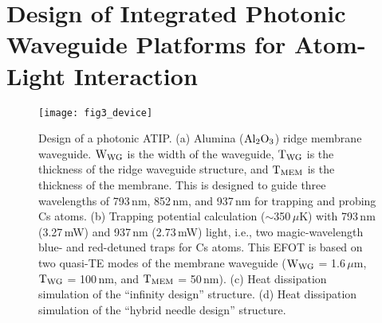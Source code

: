 \documentclass{osa-article}
\begin{document}
\section{Design of Integrated Photonic Waveguide Platforms for Atom-Light Interaction}

\begin{figure}[b!]
\centering\texttt{[image: fig3\_device]}
\caption{Design of a photonic ATIP. (a) Alumina ($\rm{Al_{2}O_{3}}$) ridge membrane waveguide. $\rm{W_{WG}}$ is the width of the waveguide, $\rm{T_{WG}}$ is the thickness of the ridge waveguide structure, and $\rm{T_{MEM}}$ is the thickness of the membrane. This is designed to guide three wavelengths of 793\,nm, 852\,nm, and 937\,nm for trapping and probing Cs atoms. (b) Trapping potential calculation ($\sim$350\,$\mu$K) with 793\,nm (3.27\,mW) and 937\,nm (2.73\,mW) light, i.e.,  two magic-wavelength blue- and red-detuned traps for Cs atoms. This EFOT is based on two quasi-TE modes of the membrane waveguide ($\rm{W_{WG}}$ = 1.6\,$\mu$m, $\rm{T_{WG}}$ = 100\,nm, and $\rm{T_{MEM}}$ = 50\,nm). (c) Heat dissipation simulation of the ``infinity design'' structure. (d) Heat dissipation simulation of the ``hybrid needle design'' structure.}
\label{fig_3}
\end{figure}
\end{document}

